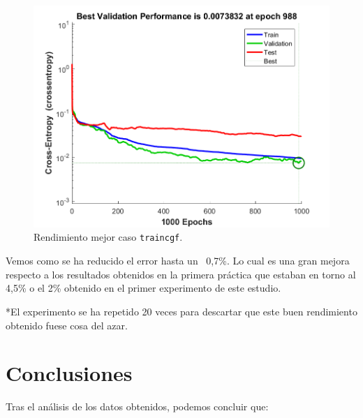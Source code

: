 \documentclass[a4paper,12pt,titlepage]{article}
\begin{document}
\begin{figure}[!ht]
	\centering
	\label{fig:traincgb}
	\includegraphics[width=\textwidth]{traincgf560000405.png}
	\caption{Rendimiento mejor caso \lstinline|traincgf|.}
\end{figure}

Vemos como se ha reducido el error hasta un ~0,7\%. Lo cual es una gran mejora respecto a los resultados obtenidos en la primera práctica que estaban en torno al 4,5\% o el 2\% obtenido en el primer experimento de este estudio. 

*El experimento se ha repetido 20 veces para descartar que este buen rendimiento obtenido fuese cosa del azar.

\newpage
\section{Conclusiones}

Tras el análisis de los datos obtenidos, podemos concluir que:
\end{document}
